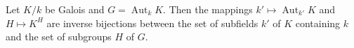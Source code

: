 Let $K/k$ be Galois and $G = \operatorname{Aut}_k K$. Then the mappings $k' \mapsto \operatorname{Aut}_{k'} K$ and $H \mapsto K^H$ are inverse bijections between the set of subfields $k'$ of $K$ containing $k$ and the set of subgroups $H$ of $G$.
